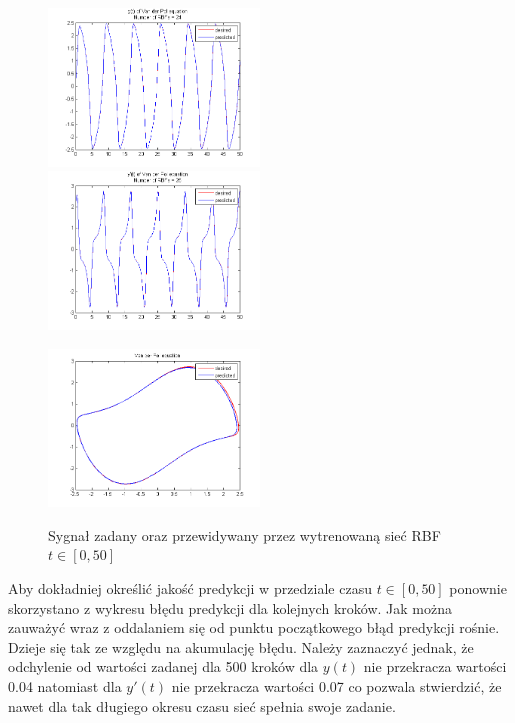 \begin{figure}[ht!]
	\centering

	\subfloat
	{\includegraphics[width=0.5\textwidth]
	{images/signal_pred400.png}}
	\subfloat
	{\includegraphics[width=0.5\textwidth]
	{images/deriv_pred400.png}}	
	
	\subfloat
	{\includegraphics[width=0.5\textwidth]
	{images/trajectory_pred400.png}}

	\caption{Sygnał zadany oraz przewidywany przez wytrenowaną sieć RBF $t \in [0,50]$}
	\label{img:predicted2}
\end{figure}

Aby dokładniej określić jakość predykcji w przedziale czasu $t \in [0, 50]$ ponownie skorzystano z wykresu błędu predykcji dla kolejnych kroków. Jak można zauważyć wraz z oddalaniem się od punktu początkowego błąd predykcji rośnie. Dzieje się tak ze względu na akumulację błędu. Należy zaznaczyć jednak, że odchylenie od wartości zadanej dla 500 kroków dla $y(t)$ nie przekracza wartości 0.04 natomiast dla $y'(t)$ nie przekracza wartości 0.07 co pozwala stwierdzić, że nawet dla tak długiego okresu czasu sieć spełnia swoje zadanie.

